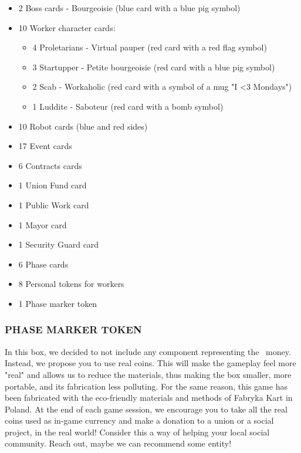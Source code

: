     \begin{itemize}
        \item 2 Boss cards - Bourgeoisie
    (blue card with a blue pig symbol)
    
        \item 10 Worker character cards:
    
        \begin{itemize}
            \item 4 Proletarians - Virtual pauper
    (red card with a red flag symbol)
    
            \item 3 Startupper - Petite bourgeoisie
    (red card with a blue pig symbol)
    
            \item 2 Scab - Workaholic (red card with a
    symbol of a mug "I \textless3 Mondays")
    
            \item 1 Luddite - Saboteur
    (red card with a bomb symbol)
    \end{itemize}
    
        \item 10 Robot cards (blue and red sides)
        \item 17 Event cards
        \item 6 Contracts cards
        \item 1 Union Fund card
        \item 1 Public Work card
        \item 1 Mayor card
        \item 1 Security Guard card
        \item 6 Phase cards
        \item 8 Personal tokens for workers
        \item 1 Phase marker token
    \end{itemize}

    \subsubsection{PHASE MARKER TOKEN}
        In this box, we decided to not include any component representing
        the \faRubleSign\ money. Instead, we propose
        you to use real coins. This will make
        the gameplay feel more "real" and
        allows us to reduce the materials,
        thus making the box smaller, more
        portable, and its fabrication less
        polluting. For the same reason, this
        game has been fabricated with the
        eco-friendly materials and methods of Fabryka Kart in Poland.
        At the end of each game session,
        we encourage you to take all the
        real coins used as in-game currency and make a donation to a
        union or a social project, in the real
        world! Consider this a way of helping your local social community.
        Reach out, maybe we can recommend some entity!
